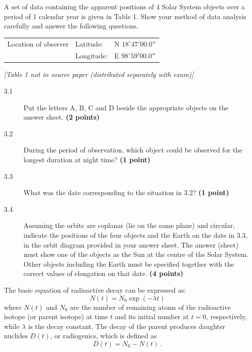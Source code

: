 
A set of data containing the apparent positions of 4 Solar System objects
over a period of 1 calendar year is given in Table 1. Show your method of
data analysis carefully and answer the following questions.

\begin{center}
\begin{tabular}{lll}
Location of observer & Latitude: & N $18^\circ 47' 00.0''$ \\
 & Longitude: & E $98^\circ 59' 00.0''$ \\
\end{tabular}
\end{center}

\textit{[Table 1 not in source paper (distributed separately with exam)]}

\begin{description}
\item[3.1] Put the letters A, B, C and D beside the appropriate objects on
  the answer sheet. \textbf{(2 points)}
\item[3.2] During the period of observation, which object could be observed
  for the longest duration at night time? \textbf{(1 point)}
\item[3.3] What was the date corresponding to the situation in 3.2?
  \textbf{(1 point)}
\item[3.4] Assuming the orbits are coplanar (lie on the same plane) and
  circular, indicate the positions of the four objects and the Earth on the
  date in 3.3, in the orbit diagram provided in your answer sheet. The answer
  (sheet) must show one of the objects as the Sun at the centre of the Solar
  System. Other objects including the Earth must be specified together with
  the correct values of elongation on that date. \textbf{(4 points)}
\end{description}

The basic equation of radioactive decay can be expressed as:
\[ N(t) = N_0 \exp(-\lambda t) \]
where $N(t)$ and $N_0$ are the number of remaining atoms of the radioactive
isotope (or parent isotope) at time $t$ and its initial number at $t = 0$,
respectively, while $\lambda$ is the decay constant. The decay of the parent
produces daughter nuclides $D(t)$, or radiogenics, which is defined as
\[ D(t) = N_0 - N(t)\,. \]

